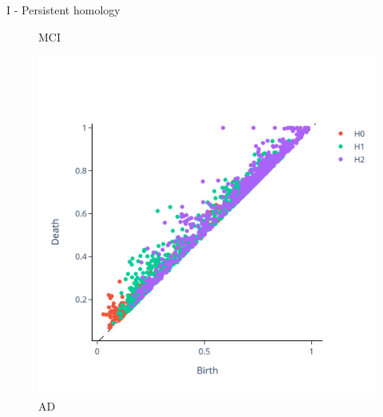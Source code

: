\documentclass[aspectratio=169, 10pt, dvipsnames]{beamer}
\begin{document}
\begin{frame}[fragile]{I - Persistent homology}
\begin{figure}
    \caption{MCI}
  \end{figure}%
  \endminipage
  \hfill
  \begin{figure}
    \centering
    \includegraphics[width=\textwidth]{figures/PDs/persistence_diagram_AD.png}
    \caption{AD}
  \end{figure}
  \endminipage
\end{frame}
\end{document}
